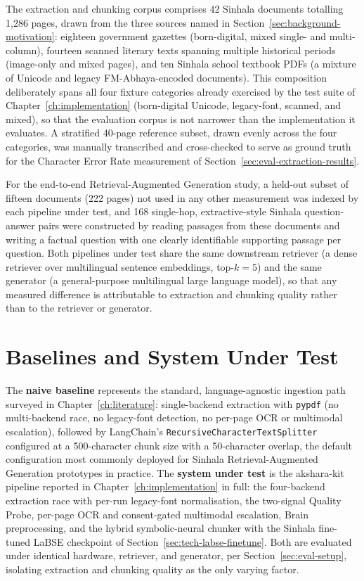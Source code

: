 \documentclass[12pt,a4paper,oneside]{report}
\begin{document}
The extraction and chunking corpus comprises 42 Sinhala documents totalling 1{,}286 pages, drawn from the three sources named in Section~\ref{sec:background-motivation}: eighteen government gazettes (born-digital, mixed single- and multi-column), fourteen scanned literary texts spanning multiple historical periods (image-only and mixed pages), and ten Sinhala school textbook PDFs (a mixture of Unicode and legacy FM-Abhaya-encoded documents). This composition deliberately spans all four fixture categories already exercised by the test suite of Chapter~\ref{ch:implementation} (born-digital Unicode, legacy-font, scanned, and mixed), so that the evaluation corpus is not narrower than the implementation it evaluates. A stratified 40-page reference subset, drawn evenly across the four categories, was manually transcribed and cross-checked to serve as ground truth for the Character Error Rate measurement of Section~\ref{sec:eval-extraction-results}.

For the end-to-end Retrieval-Augmented Generation study, a held-out subset of fifteen documents (222 pages) not used in any other measurement was indexed by each pipeline under test, and 168 single-hop, extractive-style Sinhala question-answer pairs were constructed by reading passages from these documents and writing a factual question with one clearly identifiable supporting passage per question. Both pipelines under test share the same downstream retriever (a dense retriever over multilingual sentence embeddings, top-$k=5$) and the same generator (a general-purpose multilingual large language model), so that any measured difference is attributable to extraction and chunking quality rather than to the retriever or generator.

\section{Baselines and System Under Test}
\label{sec:eval-baselines}
The \textbf{naive baseline} represents the standard, language-agnostic ingestion path surveyed in Chapter~\ref{ch:literature}: single-backend extraction with \texttt{pypdf} (no multi-backend race, no legacy-font detection, no per-page OCR or multimodal escalation), followed by LangChain's \texttt{RecursiveCharacterTextSplitter} \cite{langchain2024} configured at a 500-character chunk size with a 50-character overlap, the default configuration most commonly deployed for Sinhala Retrieval-Augmented Generation prototypes in practice. The \textbf{system under test} is the akshara-kit pipeline reported in Chapter~\ref{ch:implementation} in full: the four-backend extraction race with per-run legacy-font normalisation, the two-signal Quality Probe, per-page OCR and consent-gated multimodal escalation, Brain preprocessing, and the hybrid symbolic-neural chunker with the Sinhala fine-tuned LaBSE checkpoint of Section~\ref{sec:tech-labse-finetune}. Both are evaluated under identical hardware, retriever, and generator, per Section~\ref{sec:eval-setup}, isolating extraction and chunking quality as the only varying factor.
\end{document}
